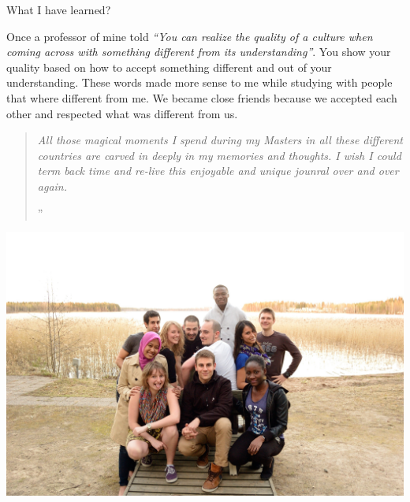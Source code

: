 \documentclass[10pt,a4paper]{article} %
\newcommand{\NewsItem}[1]{ %
\usefont{T1}{fvs}{n}{n} %
\vspace{24pt}\large #1\vspace{3pt} %
\par \normalsize \normalfont}
\begin{document}
\begin{multicols}{3}
\NewsItem{What I have learned?}

Once a professor of mine told \textit{``You can realize the 
	quality of a culture when coming across with something different 
	from its understanding''}. 
You show your quality based on how to accept something different and 
out of your understanding.
These words made more sense to me while studying with people that where different 
from me. 
We became close friends because we accepted each other and respected what was 
different from us. 
 




\begin{quotation} %

\noindent\normalsize\textit{All those magical moments I spend during my 
	Masters in all these different countries are carved in deeply in my 
	memories and thoughts. 
	I wish I could term back time and re-live this enjoyable and unique 
	jounral over and over again.
}

\hfill{\Huge''}

\end{quotation}


\end{multicols}


\begin{center}
	\vspace{10pt}
	\includegraphics[width=0.8\linewidth]{media/perccom_family.jpg} %

	\vspace{10pt}
\end{center}
\end{document}
